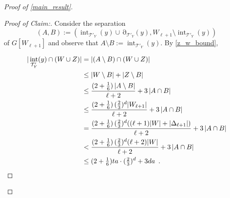 \documentclass{patmorin}
\newenvironment{clmproof}{\begin{proof}[Proof of Claim:]\renewcommand{\qedsymbol}{\rule{1ex}{1ex}}}{\end{proof}}
\DeclareMathOperator{\interior}{int}
\DeclareMathOperator{\boundary}{\partial}
\begin{document}
\begin{proof}[Proof of \cref{main_result}]
  \begin{clmproof}
  Consider the separation
  \[
    (A,B):=(\interior_{\mathcal{T}'_Y}(y)\cup\boundary_{\mathcal{T}'_Y}(y),W_{\ell+1}\setminus\interior_{\mathcal{T}'_Y}(y))
  \]
  of $G[W_{\ell+1}]$ and observe that $A\setminus B:=\interior_{\mathcal{T}'_Y}(y)$.
  By \cref{z_w_bound},

  \begin{align*}
  |\interior_{\mathcal{T}'_Y}(y)\cap (W\cup Z)|
  & = |(A\setminus B)\cap (W\cup Z)| \\
  & \le |W\setminus B| + |Z\setminus B| \\
  & \le
     \frac{(2+\tfrac{1}{6})\,|A\setminus B|}{\ell+2} + 3\,|A\cap B| \\
  & \le \frac{(2+\tfrac{1}{6})\,(\tfrac{2}{3})^d|W_{\ell+1}|}{\ell+2} + 3\,|A\cap B| \\
  & = \frac{(2+\tfrac{1}{6})\,(\tfrac{2}{3})^d((\ell+1)|W|+|\Delta_{\ell+1}|)}{\ell+2} + 3\,|A\cap B| \\
  & < \frac{(2+\tfrac{1}{6})\,(\tfrac{2}{3})^d(\ell+2)|W|}{\ell+2} + 3\,|A\cap B| \\
  & \le (2+\tfrac{1}{6})ta\cdot(\tfrac{2}{3})^d + 3da \enspace . \qedhere
  \end{align*}
  \end{clmproof}


\end{proof}
\end{document}

